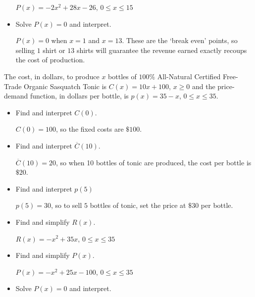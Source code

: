 \documentclass{ximera}
\begin{document}
\begin{question}
\begin{problem}
\begin{itemize}
\begin{solution}
    $P(x) = -2x^2+28x-26$, $0 \leq x \leq 15$
\end{solution}
\item  Solve $P(x) = 0$ and interpret.

\begin{solution}
    $P(x) = 0$ when $x = 1$ and $x=13$.  These are the `break even' points, so selling $1$ shirt or $13$ shirts will guarantee the revenue earned exactly recoups the cost of production.
\end{solution}
\end{itemize}

\end{problem}

\begin{problem}
The cost, in dollars, to produce $x$ bottles of $100 \%$ All-Natural Certified Free-Trade Organic Sasquatch Tonic is $C(x) = 10x+100$, $x \geq 0$ and the price-demand function, in dollars per bottle,  is $p(x) = 35 - x$, $0 \leq x \leq 35$.

\begin{itemize}

\item  Find and interpret $C(0)$.

\begin{solution}
    $C(0) = 100$, so the fixed costs are $\$100$.
\end{solution}
\item  Find and interpret $\overline{C}(10)$.

\begin{solution}
    $\overline{C}(10) = 20$, so when 10 bottles of tonic are produced, the cost per bottle is $\$20$.
\end{solution}
\item  Find and interpret $p(5)$

\begin{solution}
    $p(5) = 30$, so to sell $5$ bottles of tonic, set the price at $\$30$ per bottle.
\end{solution}
\item  Find and simplify $R(x)$.

\begin{solution}
    $R(x) = -x^2+35x$, $0 \leq x \leq 35$
\end{solution}
\item  Find and simplify $P(x)$.

\begin{solution}
    $P(x) = -x^2+25x-100$, $0 \leq x \leq 35$
\end{solution}
\item  Solve $P(x) = 0$ and interpret.


\end{itemize}
\end{problem}
\end{question}
\end{document}
